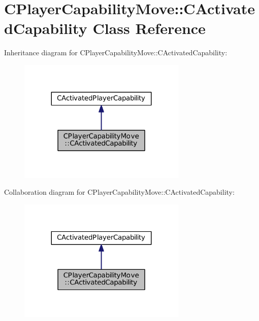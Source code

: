 \hypertarget{classCPlayerCapabilityMove_1_1CActivatedCapability}{}\section{C\+Player\+Capability\+Move\+:\+:C\+Activated\+Capability Class Reference}
\label{classCPlayerCapabilityMove_1_1CActivatedCapability}


Inheritance diagram for C\+Player\+Capability\+Move\+:\+:C\+Activated\+Capability\+:
\nopagebreak
\begin{figure}[H]
\begin{center}
\leavevmode
\includegraphics[width=227pt]{classCPlayerCapabilityMove_1_1CActivatedCapability__inherit__graph}
\end{center}
\end{figure}


Collaboration diagram for C\+Player\+Capability\+Move\+:\+:C\+Activated\+Capability\+:
\nopagebreak
\begin{figure}[H]
\begin{center}
\leavevmode
\includegraphics[width=227pt]{classCPlayerCapabilityMove_1_1CActivatedCapability__coll__graph}
\end{center}
\end{figure}
